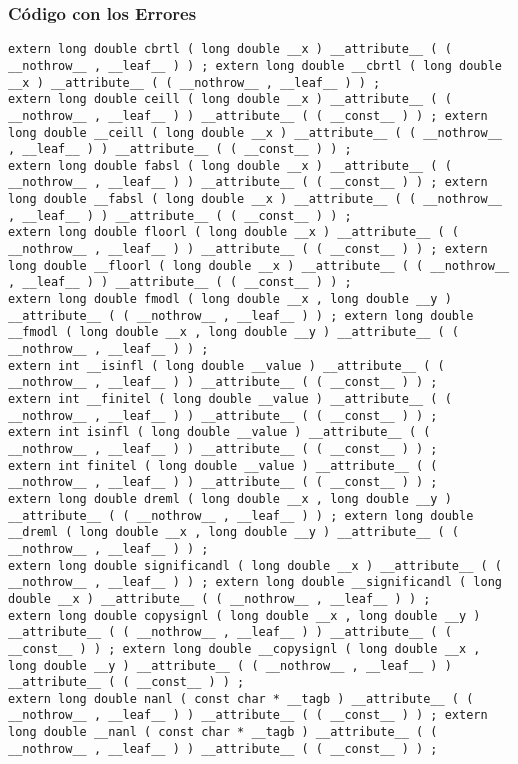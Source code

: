 \documentclass{beamer}
\begin{document}
\begin{frame}[fragile]
\frametitle{C\'odigo con los Errores}
\begin{verbatim}
extern long double cbrtl ( long double __x ) __attribute__ ( ( __nothrow__ , __leaf__ ) ) ; extern long double __cbrtl ( long double __x ) __attribute__ ( ( __nothrow__ , __leaf__ ) ) ; 
extern long double ceill ( long double __x ) __attribute__ ( ( __nothrow__ , __leaf__ ) ) __attribute__ ( ( __const__ ) ) ; extern long double __ceill ( long double __x ) __attribute__ ( ( __nothrow__ , __leaf__ ) ) __attribute__ ( ( __const__ ) ) ; 
extern long double fabsl ( long double __x ) __attribute__ ( ( __nothrow__ , __leaf__ ) ) __attribute__ ( ( __const__ ) ) ; extern long double __fabsl ( long double __x ) __attribute__ ( ( __nothrow__ , __leaf__ ) ) __attribute__ ( ( __const__ ) ) ; 
extern long double floorl ( long double __x ) __attribute__ ( ( __nothrow__ , __leaf__ ) ) __attribute__ ( ( __const__ ) ) ; extern long double __floorl ( long double __x ) __attribute__ ( ( __nothrow__ , __leaf__ ) ) __attribute__ ( ( __const__ ) ) ; 
extern long double fmodl ( long double __x , long double __y ) __attribute__ ( ( __nothrow__ , __leaf__ ) ) ; extern long double __fmodl ( long double __x , long double __y ) __attribute__ ( ( __nothrow__ , __leaf__ ) ) ; 
extern int __isinfl ( long double __value ) __attribute__ ( ( __nothrow__ , __leaf__ ) ) __attribute__ ( ( __const__ ) ) ; 
extern int __finitel ( long double __value ) __attribute__ ( ( __nothrow__ , __leaf__ ) ) __attribute__ ( ( __const__ ) ) ; 
extern int isinfl ( long double __value ) __attribute__ ( ( __nothrow__ , __leaf__ ) ) __attribute__ ( ( __const__ ) ) ; 
extern int finitel ( long double __value ) __attribute__ ( ( __nothrow__ , __leaf__ ) ) __attribute__ ( ( __const__ ) ) ; 
extern long double dreml ( long double __x , long double __y ) __attribute__ ( ( __nothrow__ , __leaf__ ) ) ; extern long double __dreml ( long double __x , long double __y ) __attribute__ ( ( __nothrow__ , __leaf__ ) ) ; 
extern long double significandl ( long double __x ) __attribute__ ( ( __nothrow__ , __leaf__ ) ) ; extern long double __significandl ( long double __x ) __attribute__ ( ( __nothrow__ , __leaf__ ) ) ; 
extern long double copysignl ( long double __x , long double __y ) __attribute__ ( ( __nothrow__ , __leaf__ ) ) __attribute__ ( ( __const__ ) ) ; extern long double __copysignl ( long double __x , long double __y ) __attribute__ ( ( __nothrow__ , __leaf__ ) ) __attribute__ ( ( __const__ ) ) ; 
extern long double nanl ( const char * __tagb ) __attribute__ ( ( __nothrow__ , __leaf__ ) ) __attribute__ ( ( __const__ ) ) ; extern long double __nanl ( const char * __tagb ) __attribute__ ( ( __nothrow__ , __leaf__ ) ) __attribute__ ( ( __const__ ) ) ; 
\end{verbatim}
\end{frame}
\end{document}
